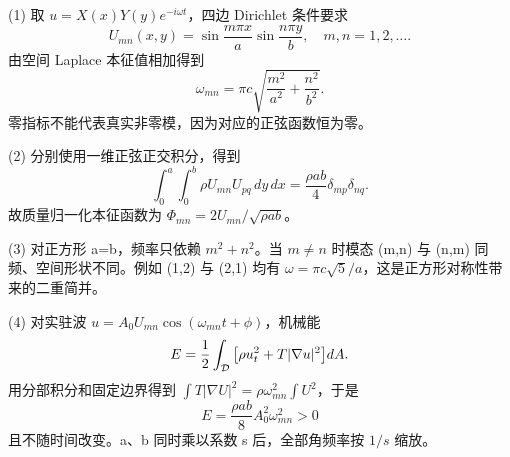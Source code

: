 (1) 取 \(u=X(x)Y(y)e^{-i\omega t}\)，四边 Dirichlet 条件要求
\[
U_{mn}(x,y)=\sin\frac{m\pi x}{a}\sin\frac{n\pi y}{b},
\quad m,n=1,2,\ldots.
\]
由空间 Laplace 本征值相加得到
\[
\omega_{mn}=\pi c\sqrt{\frac{m^2}{a^2}+\frac{n^2}{b^2}}.
\]
零指标不能代表真实非零模，因为对应的正弦函数恒为零。

(2) 分别使用一维正弦正交积分，得到
\[
\int_0^a\!\int_0^b \rho U_{mn}U_{pq}\,dy\,dx
=\frac{\rho ab}{4}\delta_{mp}\delta_{nq}.
\]
故质量归一化本征函数为 \(\Phi_{mn}=2U_{mn}/\sqrt{\rho ab}\)。

(3) 对正方形 a=b，频率只依赖 \(m^2+n^2\)。当 \(m\ne n\) 时模态 (m,n) 与 (n,m) 同频、空间形状不同。例如 (1,2) 与 (2,1) 均有 \(\omega=\pi c\sqrt5/a\)，这是正方形对称性带来的二重简并。

(4) 对实驻波 \(u=A_0U_{mn}\cos(\omega_{mn}t+\phi)\)，机械能
\[
E=\frac12\int_{\cal D}\big[\rho u_t^2+T|\nabla u|^2\big]dA.
\]
用分部积分和固定边界得到 \(\int T|\nabla U|^2=\rho\omega_{mn}^2\int U^2\)，于是
\[
E=\frac{\rho ab}{8}A_0^2\omega_{mn}^2>0
\]
且不随时间改变。a、b 同时乘以系数 s 后，全部角频率按 \(1/s\) 缩放。

